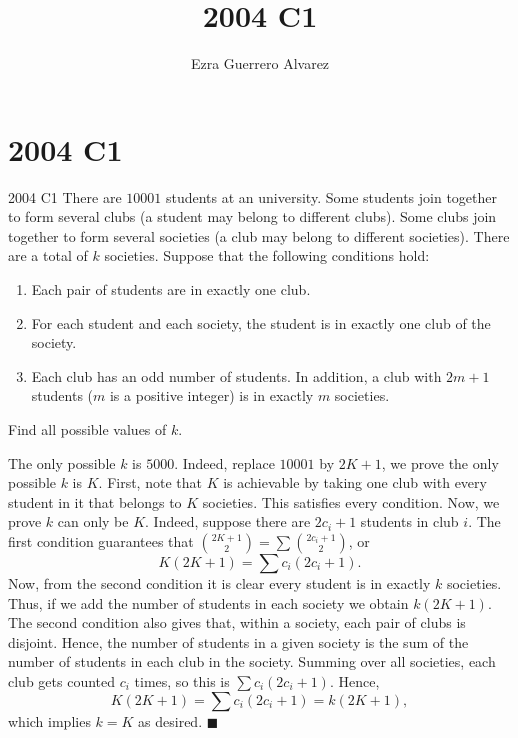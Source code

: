 \documentclass[14pt]{article}
\title{2004 C1}
\author{Ezra Guerrero Alvarez}
\begin{document}
\maketitle
	
\section*{2004 C1}

\begin{statement}{2004 C1}
	There are $10001$ students at an university. Some students 
	join together to form several clubs (a student may belong to 
	different clubs). Some clubs join together to form several 
	societies (a club may belong to different societies). There 
	are a total of $k$ societies. Suppose that the following 
	conditions hold:
	\begin{enumerate}
		\item Each pair of students are in exactly one club.
		\item For each student and each society, the student is 
		in exactly one club of the society.
		\item Each club has an odd number of students. In 
		addition, a club with ${2m+1}$ students ($m$ is a 
		positive integer) is in exactly $m$ societies.
	\end{enumerate}
	Find all possible values of $k$.
\end{statement}
The only possible $k$ is $5000$. Indeed, replace $10001$ by 
$2K+1$, we prove the only possible $k$ is $K$. First, note that 
$K$ is achievable by taking one club with every student in it 
that belongs to $K$ societies. This satisfies every condition. 
Now, we prove $k$ can only be $K$. Indeed, suppose there are 
$2c_i+1$ students in club $i$. The first condition guarantees 
that $\binom{2K+1}2=\sum\binom{2c_i+1}2$, or 
\[ K(2K+1)=\sum c_i(2c_i+1). \]
Now, from the second condition it is clear every student is in 
exactly $k$ societies. Thus, if we add the number of students in 
each society we obtain $k(2K+1)$. The second condition also 
gives that, within a society, each pair of clubs is disjoint. 
Hence, the number of students in a given society is the sum of 
the number of students in each club in the society. Summing over 
all societies, each club gets counted $c_i$ times, so this is 
$\sum c_i(2c_i+1)$. Hence,
\[ K(2K+1)=\sum c_i(2c_i+1)=k(2K+1), \]
which implies $k=K$ as desired. $\blacksquare$
	
\end{document}
